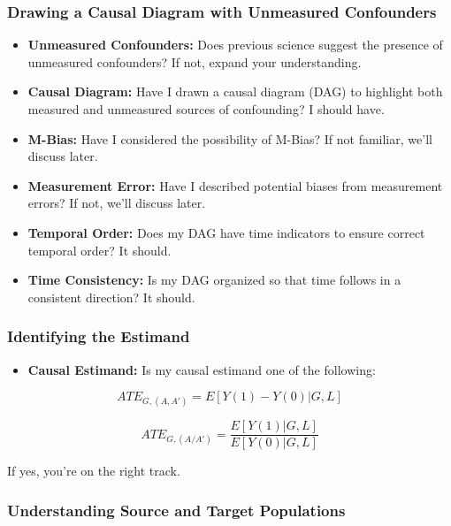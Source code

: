 \documentclass[
  singlecolumn]{article}
\providecommand{\tightlist}{%
  \setlength{\itemsep}{0pt}\setlength{\parskip}{0pt}}\usepackage{longtable,booktabs,array}
\begin{document}
\subsubsection{Drawing a Causal Diagram with Unmeasured
Confounders}\label{drawing-a-causal-diagram-with-unmeasured-confounders}

\begin{itemize}
\tightlist
\item
  \textbf{Unmeasured Confounders:} Does previous science suggest the
  presence of unmeasured confounders? If not, expand your understanding.
\item
  \textbf{Causal Diagram:} Have I drawn a causal diagram (DAG) to
  highlight both measured and unmeasured sources of confounding? I
  should have.
\item
  \textbf{M-Bias:} Have I considered the possibility of M-Bias? If not
  familiar, we'll discuss later.
\item
  \textbf{Measurement Error:} Have I described potential biases from
  measurement errors? If not, we'll discuss later.
\item
  \textbf{Temporal Order:} Does my DAG have time indicators to ensure
  correct temporal order? It should.
\item
  \textbf{Time Consistency:} Is my DAG organized so that time follows in
  a consistent direction? It should.
\end{itemize}

\subsubsection{Identifying the Estimand}\label{identifying-the-estimand}

\begin{itemize}
\tightlist
\item
  \textbf{Causal Estimand:} Is my causal estimand one of the following:
\end{itemize}

\[ATE_{G,(A,A')} = E[Y(1) - Y(0)|G, L]\]

\[ATE_{G,(A/A')} = \frac{E[Y(1)|G, L]}{E[Y(0)|G, L]}\]

If yes, you're on the right track.

\subsubsection{Understanding Source and Target
Populations}\label{understanding-source-and-target-populations}
\end{document}
